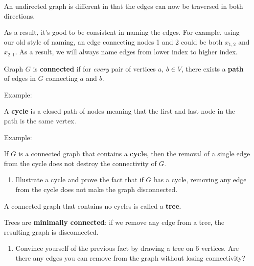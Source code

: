 \documentclass[11pt]{article}
\theoremstyle{definition}
\begin{document}
An undirected graph is different in that the edges can now be traversed in both directions. \vspace{1in}

As a result, it's good to be consistent in naming the edges. For example, using our old style of naming, an edge connecting nodes 1 and 2 could be both $x_{1,2}$ and $x_{2,1}$. As a result, we will always name edges from lower index to higher index.

\newpage


\begin{tcolorbox}
Graph $G$ is \textbf{connected} if for \emph{every} pair of vertices $a,~b \in V$, there exists a \textbf{path} of edges in $G$ connecting $a$ and $b$.  
\end{tcolorbox}

Example: \vspace{2in}

\begin{tcolorbox}
A \textbf{cycle} is a closed path of nodes meaning that the first and last node in the path is the same vertex.
\end{tcolorbox}

Example: \vspace{2in}

\begin{tcolorbox}
If $G$ is a connected graph that contains a \textbf{cycle}, then the removal of a single edge from the cycle does not destroy the connectivity of $G$.
\end{tcolorbox}

\begin{enumerate}[resume]
\item Illustrate a cycle and prove the fact that if $G$ has a cycle, removing any edge from the cycle does not make the graph disconnected.
\end{enumerate}

\newpage



\begin{tcolorbox}
A connected graph that contains no cycles is called a \textbf{tree}.  
\end{tcolorbox} \vspace{3in}

\begin{tcolorbox}
Trees are \textbf{minimally connected}:  if we remove any edge from a tree, the resulting graph is disconnected.
\end{tcolorbox}
\begin{enumerate}[resume]
\item Convince yourself of the previous fact by drawing a tree on 6 vertices.  Are there any edges you can remove from the graph without losing connectivity?
\end{enumerate}
\end{document}
